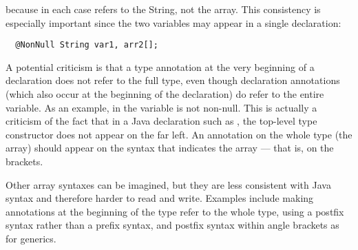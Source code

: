 \documentclass[10pt]{article}
\begin{document}
\noindent
because in each case  refers to the String, not the array.
This consistency is especially important since the two variables may appear in a single
declaration:

\preverbnegspace
\begin{Verbatim}
  @NonNull String var1, arr2[];
\end{Verbatim}

% 




A potential criticism is that a type annotation at the very beginning of a
declaration does not refer to the full type, even though declaration
annotations (which also occur at the beginning of
the declaration) do refer to the entire variable.  As an example, in
 the variable  is not non-null.
This is actually a criticism of the fact that in a Java declaration such as
, the top-level type constructor does not appear on
the far left.
An annotation on the whole type (the array) should
appear on the syntax that indicates the array --- that is, on the brackets.


Other array syntaxes can be imagined, but they are less consistent with
Java syntax and therefore harder to read and write.
Examples include
making annotations at the beginning of the type refer to the whole type,
using a postfix syntax rather than a prefix syntax, and postfix syntax
within angle brackets as for generics.

\end{document}
